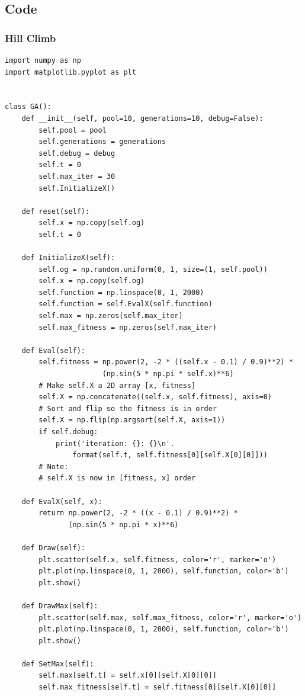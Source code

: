 \documentclass[12pt]{article}
\begin{document}
\newpage
\subsection{Code}
\subsubsection{Hill Climb}
\begin{lstlisting}
import numpy as np
import matplotlib.pyplot as plt


class GA():
    def __init__(self, pool=10, generations=10, debug=False):
        self.pool = pool
        self.generations = generations
        self.debug = debug
        self.t = 0
        self.max_iter = 30
        self.InitializeX()

    def reset(self):
        self.x = np.copy(self.og)
        self.t = 0

    def InitializeX(self):
        self.og = np.random.uniform(0, 1, size=(1, self.pool))
        self.x = np.copy(self.og)
        self.function = np.linspace(0, 1, 2000)
        self.function = self.EvalX(self.function)
        self.max = np.zeros(self.max_iter)
        self.max_fitness = np.zeros(self.max_iter)

    def Eval(self):
        self.fitness = np.power(2, -2 * ((self.x - 0.1) / 0.9)**2) * 
                       (np.sin(5 * np.pi * self.x)**6)
        # Make self.X a 2D array [x, fitness]
        self.X = np.concatenate((self.x, self.fitness), axis=0)
        # Sort and flip so the fitness is in order
        self.X = np.flip(np.argsort(self.X, axis=1))
        if self.debug:
            print('iteration: {}: {}\n'.
                format(self.t, self.fitness[0][self.X[0][0]]))
        # Note:
        # self.X is now in [fitness, x] order

    def EvalX(self, x):
        return np.power(2, -2 * ((x - 0.1) / 0.9)**2) *
               (np.sin(5 * np.pi * x)**6)

    def Draw(self):        
        plt.scatter(self.x, self.fitness, color='r', marker='o')
        plt.plot(np.linspace(0, 1, 2000), self.function, color='b')
        plt.show()

    def DrawMax(self):
        plt.scatter(self.max, self.max_fitness, color='r', marker='o')
        plt.plot(np.linspace(0, 1, 2000), self.function, color='b')
        plt.show()

    def SetMax(self):
        self.max[self.t] = self.x[0][self.X[0][0]]
        self.max_fitness[self.t] = self.fitness[0][self.X[0][0]]


\end{lstlisting}
\end{document}
